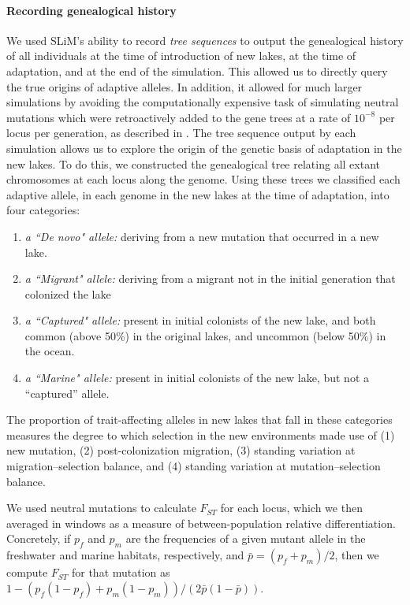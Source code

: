 \documentclass{article}
\begin{document}
\paragraph{Recording genealogical history}

We used SLiM's ability to record \emph{tree sequences} \citep{haller2018treesequence,Kelleher2016} to output the genealogical history of all individuals at the time of introduction of new lakes, at the time of adaptation, and at the end of the simulation. This allowed us to directly query the true origins of adaptive alleles. 
In addition, it allowed for much larger simulations by avoiding the computationally expensive task of simulating neutral mutations which were retroactively added to the gene trees at a rate of $10^{-8}$ per locus per generation, as described in \citet{kelleher2018efficient}.
The tree sequence output by each simulation allows us to explore the origin of the genetic basis of adaptation in the new lakes. 
To do this, we constructed the genealogical tree relating all extant chromosomes at each locus along the genome. 
Using these trees we classified each adaptive allele, in each genome in the new lakes at the time of adaptation, into four categories:

\begin{enumerate}
    \item \emph{a ``De novo" allele:}
        deriving from a new mutation that occurred in a new lake.
    \item \emph{a ``Migrant" allele:} 
        deriving from a migrant not in the initial generation that colonized the lake
    \item \emph{a ``Captured" allele:}
        present in initial colonists of the new lake, 
        and both common (above 50\%) in the original lakes,
        and uncommon (below 50\%) in the ocean.
    \item \emph{a ``Marine" allele:} 
        present in initial colonists of the new lake, 
        but not a ``captured'' allele.
\end{enumerate}

The proportion of trait-affecting alleles in new lakes that fall in these categories measures the degree to which selection in the new environments made use of (1) new mutation, (2) post-colonization migration, (3) standing variation at migration--selection balance, and (4) standing variation at mutation--selection balance.

We used neutral mutations to calculate $F_{ST}$ for each locus, which we then averaged in windows as a measure of between-population relative differentiation. 
Concretely, if $p_f$ and $p_m$ are the frequencies of a given mutant allele in the freshwater and marine habitats, respectively, and $\bar p = (p_f + p_m)/2$, 
then we compute $F_{ST}$ for that mutation as $1 - (p_f (1-p_f) + p_m (1-p_m))/ (2 \bar p (1-\bar p))$.
\end{document}
